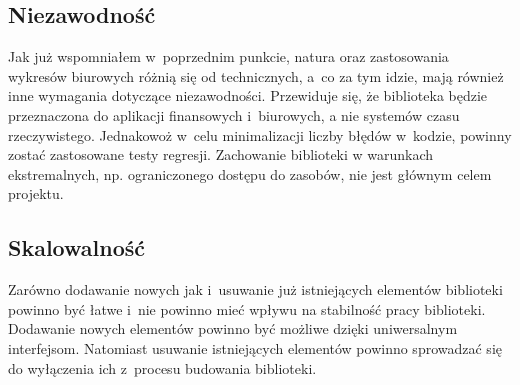 \subsection{Niezawodność}
Jak już wspomniałem w~poprzednim punkcie, natura oraz zastosowania wykresów biurowych różnią się od technicznych, a~co za tym idzie, mają również inne wymagania dotyczące niezawodności. Przewiduje się, że biblioteka będzie przeznaczona do aplikacji finansowych i~biurowych, a nie systemów czasu rzeczywistego. Jednakowoż w~celu minimalizacji liczby błędów w~kodzie, powinny zostać zastosowane testy regresji. Zachowanie biblioteki w warunkach ekstremalnych, np. ograniczonego dostępu do zasobów, nie jest głównym celem projektu.


\subsection{Skalowalność}
Zarówno dodawanie nowych jak i~usuwanie już istniejących elementów biblioteki powinno być łatwe i~nie powinno mieć wpływu na stabilność pracy biblioteki. Dodawanie nowych elementów powinno być możliwe dzięki uniwersalnym interfejsom. Natomiast usuwanie istniejących elementów powinno sprowadzać się do wyłączenia ich z~procesu budowania biblioteki.
